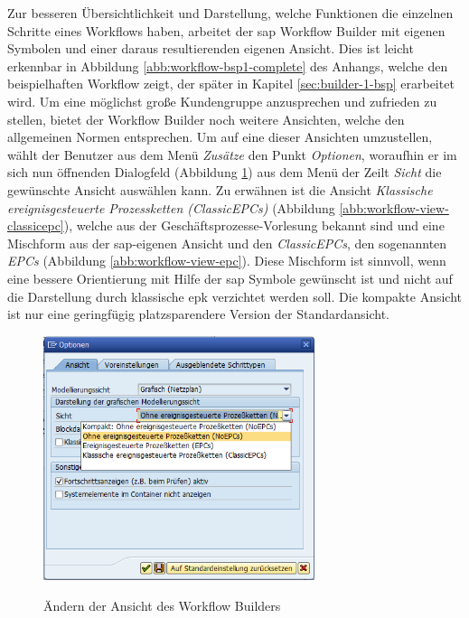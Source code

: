 Zur besseren Übersichtlichkeit und Darstellung, welche Funktionen die einzelnen Schritte eines Workflows haben, arbeitet der \gls{sap} Workflow Builder mit eigenen Symbolen und einer daraus resultierenden eigenen Ansicht. Dies ist leicht erkennbar in Abbildung \ref{abb:workflow-bsp1-complete} des Anhangs, welche den beispielhaften Workflow zeigt, der später in Kapitel \ref{sec:builder-1-bsp} erarbeitet wird. Um eine möglichst große Kundengruppe anzusprechen und zufrieden zu stellen, bietet der Workflow Builder noch weitere Ansichten, welche den allgemeinen Normen entsprechen. Um auf eine dieser Ansichten umzustellen, wählt der Benutzer aus dem Menü \textit{Zusätze} den Punkt \textit{Optionen}, woraufhin er im sich nun öffnenden Dialogfeld (Abbildung \ref{abb:workflow-change-view}) aus dem Menü der Zeilt \textit{Sicht} die gewünschte Ansicht auswählen kann. Zu erwähnen ist die Ansicht \textit{Klassische ereignisgesteuerte Prozessketten (ClassicEPCs)} (Abbildung \ref{abb:workflow-view-classicepc}), welche aus der Geschäftsprozesse-Vorlesung bekannt sind und eine Mischform aus der \gls{sap}-eigenen Ansicht und den \textit{ClassicEPCs}, den sogenannten \textit{EPCs} (Abbildung \ref{abb:workflow-view-epc}). Diese Mischform ist sinnvoll, wenn eine bessere Orientierung mit Hilfe der \gls{sap} Symbole gewünscht ist und nicht auf die Darstellung durch klassische \gls{epk} verzichtet werden soll. Die kompakte Ansicht ist nur eine geringfügig platzsparendere Version der Standardansicht.

\begin{figure}[h]
	\begin{center}
	\includegraphics[width=300px]{grafiken/wf-builder_options-change-view.png}
	\caption{Ändern der Ansicht des Workflow Builders}
	\vspace{-10pt}
	\label{abb:workflow-change-view}
	\end{center}
\end{figure}

